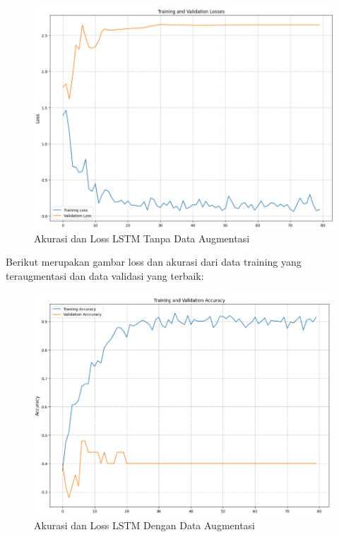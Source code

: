 \begin{figure} [H] \centering
  \includegraphics[scale=0.6]{gambar/LossLSTMnoAug.png}
  \caption{Akurasi dan Loss LSTM Tanpa Data Augmentasi}
  \label{fig:LossLSTMnoaug}
\end{figure}

\newpage
Berikut merupakan gambar loss dan akurasi dari data training yang teraugmentasi dan
data validasi yang terbaik:
\begin{figure} [H] \centering
  \includegraphics[scale=0.6]{gambar/AccLSTMaug.png}
  \caption{Akurasi dan Loss LSTM Dengan Data Augmentasi}
  \label{fig:AccLSTMaug}
\end{figure}

